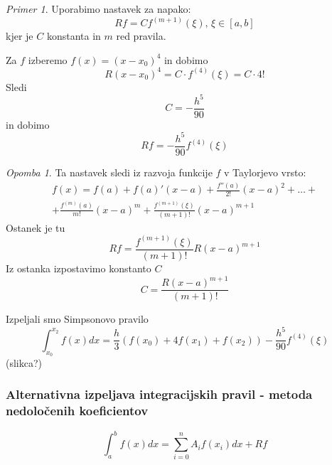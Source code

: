 \documentclass[a4paper,12pt]{article}
\theoremstyle{definition}
\theoremstyle{remark}
\newtheorem*{ex}{Primer}
\newtheorem*{rem}{Opomba}
\begin{document}
\begin{ex}
    Uporabimo nastavek za napako:
    \begin{equation*}
        Rf = C f^{(m+1)} (\xi) \text{, } \xi \in [a, b]
    \end{equation*}
    kjer je $C$ konstanta in $m$ red pravila.

    Za $f$ izberemo $f(x) = (x-x_0)^4$ in dobimo
    \begin{equation*}
        R(x-x_0)^4 = C \cdot f^{(4)} (\xi) = C\cdot4!
    \end{equation*}
    Sledi
    \begin{equation*}
        C = -\frac{h^5}{90}
    \end{equation*}
    in dobimo
    \begin{equation*}
        Rf = -\frac{h^5}{90}f^{(4)}(\xi)
    \end{equation*}

    \begin{rem}
        Ta nastavek sledi iz razvoja funkcije $f$ v Taylorjevo vrsto:
        \begin{multline*}
            f(x) = f(a) + f(a)'(x-a) + \frac{f''(a)}{2!} (x-a)^2 + \dots + \\
            + \frac{f^{(m)}(a)}{m!} (x-a)^m + \frac{f^{(m+1)}(\xi)}{(m+1)!} (x-a)^{m+1}
        \end{multline*}
        Ostanek je tu
        \begin{equation*}
            Rf = \frac{f^{(m+1)}(\xi)}{(m+1)!} R(x-a)^{m+1}
        \end{equation*}
        Iz ostanka izpostavimo konstanto $C$
        \begin{equation*}
            C = \frac{R(x-a)^{m+1}}{(m+1)!}
        \end{equation*}
    \end{rem}

    Izpeljali smo Simpsonovo pravilo
    \begin{equation*}
        \int_{x_0}^{x_2} f(x) dx = \frac{h}{3} (f(x_0) + 4f(x_1) + f(x_2)) - \frac{h^5}{90} f^{(4)}(\xi)
    \end{equation*}
    (slikca?)
\end{ex}

\subsubsection{Alternativna izpeljava integracijskih pravil - metoda nedoločenih koeficientov}
\begin{equation*}
    \int_{a}^{b} f(x) dx = \sum_{i=0}^{n} A_i f(x_i) dx + Rf
\end{equation*}
\end{document}
